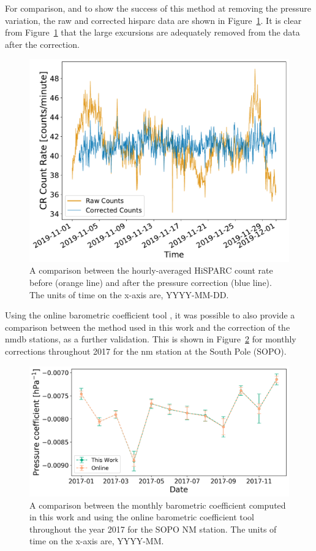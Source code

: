 For comparison, and to show the success of this method at removing the pressure variation, the raw and corrected \gls{hisparc} data are shown in Figure~\ref{fig:HS_P_corr}. It is clear from Figure~\ref{fig:HS_P_corr} that the large excursions are adequately removed from the data after the correction.

\begin{figure}[ht!]
	\centering
	\includegraphics[width=0.65\columnwidth]{501_raw_vs_corrected.pdf}
	\caption{A comparison between the hourly-averaged HiSPARC count rate before (orange line) and after the pressure correction (blue line). The units of time on the x-axis are, YYYY-MM-DD.}
	\label{fig:HS_P_corr}
\end{figure}


Using the online barometric coefficient tool \citep{paschalis_online_2013}, it was possible to also provide a comparison between the method used in this work and the correction of the \gls{nmdb} stations, as a further validation. This is shown in Figure~\ref{fig:NM_beta_variation} for monthly corrections throughout 2017 for the \gls{nm} station at the South Pole (SOPO).

\begin{figure}[ht!]
	\centering
	\includegraphics[width=0.75\columnwidth]{SOPO_beta_2017_rescale.png}
	\caption{A comparison between the monthly barometric coefficient computed in this work and using the online barometric coefficient tool throughout the year 2017 for the SOPO NM station. The units of time on the x-axis are, YYYY-MM.}
	\label{fig:NM_beta_variation}
\end{figure}


